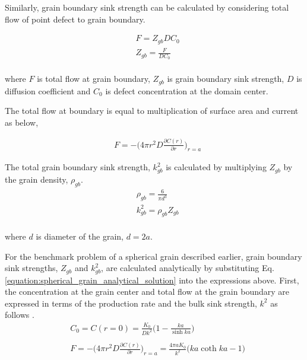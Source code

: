\documentclass[utf8]{frontiersSCNS} %
\begin{document}
    Similarly, grain boundary sink strength can be calculated by considering total flow of point defect to grain boundary.

    \begin{equation}
      \begin{aligned}
        &F=Z_{gb}DC_0\\
        &Z_{gb}=\frac{F}{DC_0}
      \end{aligned}
      \end{equation}\\
    where ${F}$ is total flow at grain boundary, ${Z_{gb}}$ is grain boundary sink strength, ${D}$ is diffusion coefficient and ${C_0}$ is defect concentration at the domain center.
    
    The total flow at boundary is equal to multiplication of surface area and current as below,

    \begin{equation}
      \begin{aligned}
        &F=-\bigg(4\pi r^2D\frac{\partial C(r)}{\partial r}\bigg)_{r=a}
      \end{aligned}
    \end{equation}
    
    The total grain boundary sink strength, ${k^2_{gb}}$ is calculated by multiplying ${Z_{gb}}$ by the grain density, ${\rho_{gb}}$. \citep{heald1977}\\
    \begin{equation}
      \begin{aligned}
        &\rho_{gb}=\frac{6}{\pi d^3}\\
        &k^2_{gb}=\rho_{gb}Z_{gb}
      \end{aligned}
    \end{equation}\\
    where ${d}$ is diameter of the grain, ${d=2a}$.
  
    For the benchmark problem of a spherical grain described earlier, grain boundary sink strengths, $Z_{gb}$ and $k^2_{gb}$, are calculated analytically by substituting Eq. \ref{equation:spherical_grain_analytical_solution} into the expressions above. First, the concentration at the grain center and total flow at the grain boundary are expressed in terms of the production rate and the bulk sink strength, $k^2$ as follows \cite{heald1977}.\\

    \begin{equation}
      \begin{aligned}
        &C_0=C(r=0)=\frac{K_0}{Dk^2}\bigg(1-\frac{ka}{\sinh{ka}}\bigg)\\\\
        &F=-\bigg(4\pi r^2D\frac{\partial C(r)}{\partial r}\bigg)_{r=a}=\frac{4\pi aK_0}{k^2}\bigg(ka\coth{ka}-1\bigg)
      \end{aligned}
    \end{equation}\\
    
\end{document}
